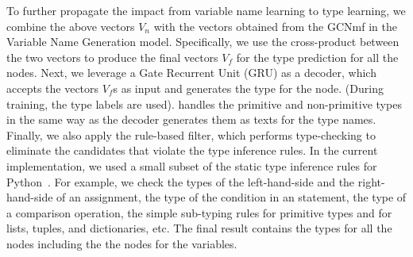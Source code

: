To further propagate the impact from variable name learning to type
learning, we combine the above vectors $V_n$ with the vectors obtained
from the GCNmf in the Variable Name Generation model. Specifically, we
use the cross-product between the two vectors to produce the final
vectors $V_f$ for the type prediction for all the nodes. Next, we
leverage a Gate Recurrent Unit (GRU) as a decoder, which accepts the
vectors $V_f$s as input and generates the type for the node. (During
training, the type labels are used).
{\tool} handles the
    primitive and non-primitive types in the same way as the decoder
    generates them as texts for the type names.
%
Finally, we also apply the rule-based filter, which performs
type-checking to eliminate the candidates that violate the type
inference rules.
%
In the current implementation, we used a small subset of
the static type inference rules for
    Python~\cite{type-system-python}. For example, we check the types
    of the left-hand-side and the right-hand-side of an assignment, the
    type of the condition in an  statement, the type of a
    comparison operation, the simple sub-typing rules for primitive
    types and for lists, tuples, and dictionaries, etc.
%
The final result contains the types for all the nodes including the
the nodes for the variables.








